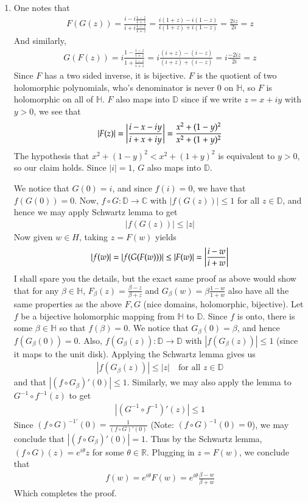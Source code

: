 \documentclass[12pt]{article}
\theoremstyle{definitionstyle}
\def\mbb#1{\mathbb{#1}}
\def \C{\mbb{C}}
\def \R{\mbb{R}}
\newcommand{\D}{\mathbb{D}}
\begin{document}
\begin{enumerate}[leftmargin=\labelsep]
		\item One notes that 
		\begin{align*}
			F(G(z)) = \frac{i-i\frac{1-z}{1+z}}{i+i\frac{1-z}{1+z}} = \frac{i(1+z)-i(1-z)}{i(1+z)+i(1-z)} = \frac{2iz}{2i} = z
		\end{align*}
		And similarly,
		\begin{align*}
			G(F(z)) = i\frac{1-\frac{i-z}{i+z}}{1+\frac{i-z}{i+z}} = i\frac{(i+z)-(i-z)}{(i+z)+(i-z)} = i\frac{-2iz}{2i} = z
		\end{align*}
		Since $F$ has a two sided inverse, it is bijective. $F$ is the quotient of two holomorphic polynomials, who's denominator is never 0 on $\mbb{H}$, so $F$ is holomorphic on all of $\mbb{H}$. $F$ also maps into $\D$ since if we write $z = x + iy$ with $y > 0$, we see that 
		\begin{align*}
			|F(z)| = \qty|\frac{i-x-iy}{i+x+iy}| = \frac{x^2+(1-y)^2}{x^2+(1+y)^2}
		\end{align*}
		The hypothesis that $x^2 + (1-y)^2 < x^2 + (1+y)^2$ is equivalent to $y > 0$, so our claim holds. Since $|i| = 1$, $G$ also maps into $\D$.
		
		We notice that $G(0) = i$, and since $f(i) = 0$, we have that $f(G(0)) = 0$. Now, $f \circ G: \D \to \C$ with $|f(G(z))| \leq 1$ for all $z \in \D$, and hence we may apply Schwartz lemma to get
		\begin{align*}
			|f(G(z))| \leq |z|
		\end{align*}
		Now given $w \in H$, taking $z = F(w)$ yields
		\begin{align*}
			|f(w)| = |f(G(F(w)))| \leq |F(w)| = \qty|\frac{i-w}{i+w}|
		\end{align*}
		I shall spare you the details, but the exact same proof as above would show that for any $\beta \in \mbb{H}$, $F_\beta(z) = \frac{\beta-z}{\beta+z}$ and $G_\beta(w) = \beta\frac{1-w}{1+w}$ also have all the same properties as the above $F, G$ (nice domains, holomorphic, bijective). Let $f$ be a bijective holomorphic mapping from $\mbb{H}$ to $\D$. Since $f$ is onto, there is some $\beta \in \mbb{H}$ so that $f(\beta) = 0$. We notice that $G_\beta(0) = \beta$, and hence $f(G_\beta(0)) = 0$. Also, $f(G_\beta(z)): \D \to \D$ with $|f(G_\beta(z))| \leq 1$ (since it maps to the unit disk). Applying the Schwartz lemma gives us
		\begin{align*}
			|f(G_\beta(z))| \leq |z| \quad \text{for all } z \in \D
		\end{align*}
		and that $|(f \circ G_\beta)'(0)| \leq 1$. Similarly, we may also apply the lemma to $G^{-1} \circ f^{-1}(z)$ to get 
		\begin{align*}
			|(G^{-1} \circ f^{-1})'(z)| \leq 1
		\end{align*}
		Since $(f \circ G)^{-1'}(0) = \frac{1}{(f \circ G)'(0)}$ (Note: $(f \circ G)^{-1}(0) = 0$), we may conclude that $|(f \circ G_\beta)'(0)| = 1$. Thus by the Schwartz lemma, $(f \circ G)(z) = e^{i\theta}z$ for some $\theta \in \R$. Plugging in $z = F(w)$, we conclude that
		\begin{align*}
			f(w) = e^{i\theta}F(w) = e^{i\theta} \frac{\beta-w}{\beta+w}
		\end{align*}
		Which completes the proof.
		

\end{enumerate}
\end{document}
